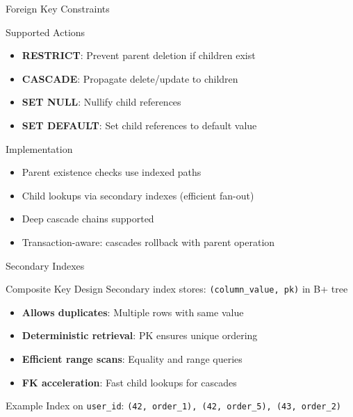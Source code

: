 \documentclass[aspectratio=169]{beamer}
\begin{document}
\begin{frame}{Foreign Key Constraints}
\begin{block}{Supported Actions}
\begin{itemize}
  \item \textbf{RESTRICT}: Prevent parent deletion if children exist
  \item \textbf{CASCADE}: Propagate delete/update to children
  \item \textbf{SET NULL}: Nullify child references
  \item \textbf{SET DEFAULT}: Set child references to default value
\end{itemize}
\end{block}

\begin{block}{Implementation}
\begin{itemize}
  \item Parent existence checks use indexed paths
  \item Child lookups via secondary indexes (efficient fan-out)
  \item Deep cascade chains supported
  \item Transaction-aware: cascades rollback with parent operation
\end{itemize}
\end{block}
\end{frame}

\begin{frame}{Secondary Indexes}
\begin{block}{Composite Key Design}
Secondary index stores: \texttt{(column\_value, pk)} in B+ tree
\end{block}

\begin{itemize}
  \item \textbf{Allows duplicates}: Multiple rows with same value
  \item \textbf{Deterministic retrieval}: PK ensures unique ordering
  \item \textbf{Efficient range scans}: Equality and range queries
  \item \textbf{FK acceleration}: Fast child lookups for cascades
\end{itemize}

\vspace{0.5cm}
\begin{exampleblock}{Example}
Index on \texttt{user\_id}: \texttt{(42, order\_1), (42, order\_5), (43, order\_2)}
\end{exampleblock}
\end{frame}
\end{document}
